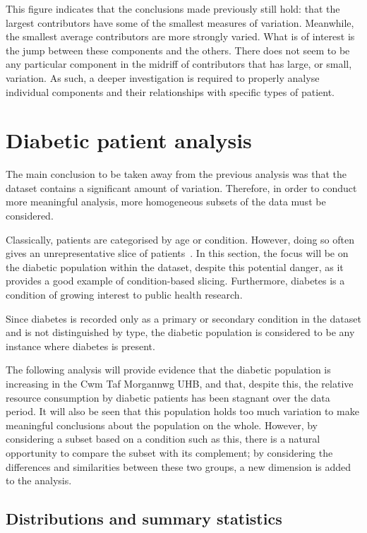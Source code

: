 This figure indicates that the conclusions made previously still hold: that the
largest contributors have some of the smallest measures of variation. Meanwhile,
the smallest average contributors are more strongly varied. What is of interest
is the jump between these components and the others. There does not seem to be
any particular component in the midriff of contributors that has large, or
small, variation. As such, a deeper investigation is required to properly
analyse individual components and their relationships with specific types of
patient.


\section{Diabetic patient analysis}\label{sec:diabetes}
\graphicspath{{chapters/data/paper/img/diabetes/}}

The main conclusion to be taken away from the previous analysis was that the
dataset contains a significant amount of variation. Therefore, in order to
conduct more meaningful analysis, more homogeneous subsets of the data must be
considered.

Classically, patients are categorised by age or condition. However, doing so
often gives an unrepresentative slice of patients~\cite{Vuik2016a}. In this
section, the focus will be on the diabetic population within the dataset,
despite this potential danger, as it provides a good example of condition-based
slicing. Furthermore, diabetes is a condition of growing interest to public
health research.

Since diabetes is recorded only as a primary or secondary condition in the
dataset and is not distinguished by type, the diabetic population is considered
to be any instance where diabetes is present.

The following analysis will provide evidence that the diabetic population is
increasing in the Cwm Taf Morgannwg UHB, and that, despite this, the relative
resource consumption by diabetic patients has been stagnant over the data
period. It will also be seen that this population holds too much variation to
make meaningful conclusions about the population on the whole. However, by
considering a subset based on a condition such as this, there is a natural
opportunity to compare the subset with its complement; by considering the
differences and similarities between these two groups, a new dimension is added
to the analysis.


\subsection{Distributions and summary statistics}%
\label{subsec:diab_dists_stats}

